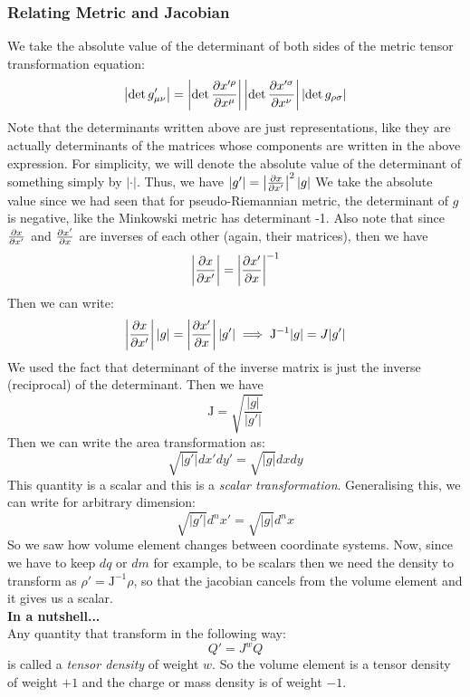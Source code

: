     \subsubsection{Relating Metric and Jacobian}
    We take the absolute value of the determinant of both sides of the metric tensor transformation equation:
    $$\left|\det g'_{\mu\nu}\right| = \left|\det\pdv{x'^\rho}{x^\mu}\right|\left|\det\pdv{x'^\sigma}{x^\nu}\right|\left|\det g_{\rho\sigma}\right|$$
    Note that the determinants written above are just representations, like they are actually determinants of the matrices whose components are written in the above expression. For simplicity, we will denote the absolute value of the determinant of something simply by $|\cdot|$. Thus, we have 
    $|g'| = \left|\pdv{x}{x'}\right|^2 |g|$
    We take the absolute value since we had seen that for pseudo-Riemannian metric, the determinant of $g$ is negative, like the Minkowski metric has determinant -1. Also note that since $\pdv{x}{x'}$ and $\pdv{x'}{x}$ are inverses of each other (again, their matrices), then we have
    $$\left|\pdv{x}{x'}\right| = \left|\pdv{x'}{x}\right|^{-1}$$ 
    Then we can write:
    $$\left|\pdv{x}{x'}\right||g| = \left|\pdv{x'}{x}\right||g'|\implies \mathrm{J}^{-1} |g| = J |g'|$$
We used the fact that determinant of the inverse matrix is just the inverse (reciprocal) of the determinant. Then we have 
$$\mathrm{J} = \sqrt{\frac{|g|}{|g'|}}$$
Then we can write the area transformation as:
$$\sqrt{|g'|}dx'dy' = \sqrt{|g|}dxdy$$
This quantity is a scalar and this is a \textit{scalar transformation}. Generalising this, we can write for arbitrary dimension:
$$\sqrt{|g'|}d^nx' = \sqrt{|g|}d^nx$$
So we saw how volume element changes between coordinate systems. Now, since we have to keep $dq$ or $dm$ for example, to be scalars then we need the density to transform as $\rho' = \mathrm{J}^{-1}\rho$, so that the jacobian cancels from the volume element and it gives us a scalar.\\[0.3cm]
\textbf{In a nutshell...}\\[0.3cm]
Any quantity that transform in the following way: 
$$Q' = J^w Q$$
is called a \textit{tensor density} of weight $w$. So the volume element is a tensor density of weight $+1$ and the charge or mass density is of weight $-1$. 